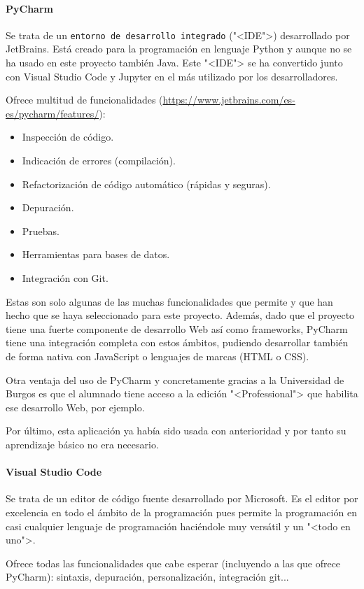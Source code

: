 \paragraph{PyCharm}
Se trata de un \texttt{entorno de desarrollo integrado} ("<IDE">) desarrollado por
JetBrains. Está creado para la programación en lenguaje Python y aunque no se ha
usado en este proyecto también Java. Este "<IDE"> se ha convertido junto con Visual
Studio Code y Jupyter en el más utilizado por los desarrolladores.

Ofrece multitud de funcionalidades (\url{https://www.jetbrains.com/es-es/pycharm/features/}):
\begin{itemize}
	\item Inspección de código.
	\item Indicación de errores (compilación).
	\item Refactorización de código automático (rápidas y seguras).
	\item Depuración.
	\item Pruebas.
	\item Herramientas para bases de datos.
	\item Integración con Git.
\end{itemize}

Estas son solo algunas de las muchas funcionalidades que permite y que han hecho
que se haya seleccionado para este proyecto. Además, dado que el proyecto tiene
una fuerte componente de desarrollo Web así como frameworks, PyCharm tiene una
integración completa con estos ámbitos, pudiendo desarrollar también de forma
nativa con JavaScript o lenguajes de marcas (HTML o CSS).

Otra ventaja del uso de PyCharm y concretamente gracias a la Universidad de
Burgos es que el alumnado tiene acceso a la edición "<Professional"> que
habilita ese desarrollo Web, por ejemplo.

Por último, esta aplicación ya había sido usada con anterioridad y por tanto su
aprendizaje básico no era necesario.

\paragraph{Visual Studio Code}
Se trata de un editor de código fuente desarrollado por Microsoft. Es el editor
por excelencia en todo el ámbito de la programación pues permite la programación
en casi cualquier lenguaje de programación haciéndole muy versátil y un "<todo
en uno">.

Ofrece todas las funcionalidades que cabe esperar (incluyendo a las que ofrece
PyCharm): sintaxis, depuración, personalización, integración git...


